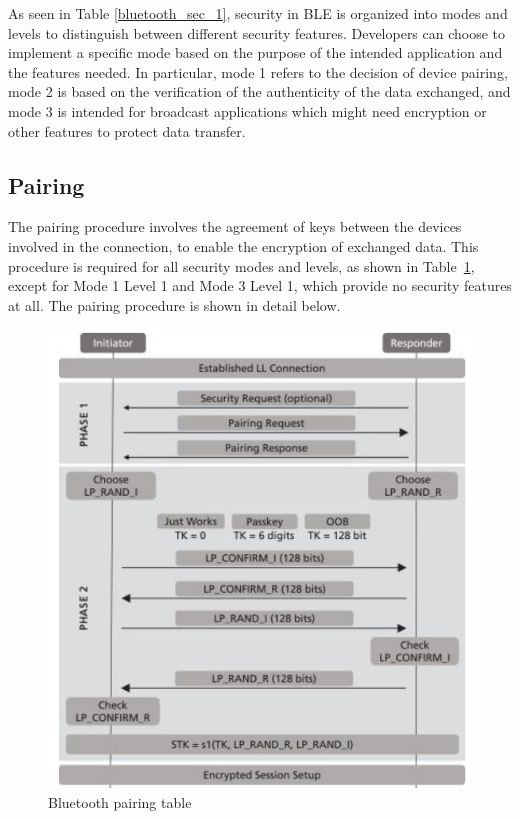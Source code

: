 \documentclass{Configuration_Files/PoliMi3i_thesis}
\begin{document}
As seen in Table \ref{bluetooth_sec_1}, security in BLE is organized into modes and levels to distinguish between different security features. Developers can choose to implement a specific mode based on the purpose of the intended application and the features needed. In particular, mode 1 refers to the decision of device pairing, mode 2 is based on the verification of the authenticity of the data exchanged, and mode 3 is intended for broadcast applications which might need encryption or other features to protect data transfer.

\subsection{Pairing}

The pairing procedure involves the agreement of keys between the devices involved in the connection, to enable the encryption of exchanged data. This procedure is required for all security modes and levels, as shown in Table~\ref{bluetooth_sec_2}, except for Mode 1 Level 1 and Mode 3 Level 1, which provide no security features at all. The pairing procedure is shown in detail below.

\begin{figure}[H]
    \centering
    \includegraphics[scale=0.7]{Bluetooth_Security/2.png}
    \caption{Bluetooth pairing table \cite{casarSurveyBluetoothLow2022}}
    \label{bluetooth_sec_2}
\end{figure}
\end{document}
